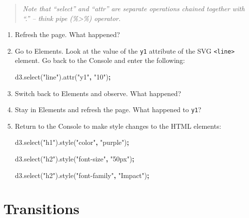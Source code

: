 \documentclass[openany]{book}
\newenvironment{Shaded}{\begin{snugshade}}{\end{snugshade}}
\newcommand{\AttributeTok}[1]{\textcolor[rgb]{0.77,0.63,0.00}{#1}}
\newcommand{\NormalTok}[1]{#1}
\newcommand{\OperatorTok}[1]{\textcolor[rgb]{0.81,0.36,0.00}{\textbf{#1}}}
\newcommand{\StringTok}[1]{\textcolor[rgb]{0.31,0.60,0.02}{#1}}
\newcommand{\VariableTok}[1]{\textcolor[rgb]{0.00,0.00,0.00}{#1}}
\begin{document}
\begin{quote}
 \emph{Note that ``select'' and ``attr'' are separate operations chained together with ``.'' -- think pipe (\%\textgreater{}\%) operator.}
\end{quote}

\begin{enumerate}
\def\labelenumi{\arabic{enumi}.}
\setcounter{enumi}{1}
\item
  Refresh the page. What happened?
\item
  Go to Elements. Look at the value of the \texttt{y1} attribute of the SVG \texttt{\textless{}line\textgreater{}} element. Go back to the Console and enter the following:

\begin{Shaded}
\begin{Highlighting}[]
\VariableTok{d3}\NormalTok{.}\AttributeTok{select}\NormalTok{(}\StringTok{"line"}\NormalTok{).}\AttributeTok{attr}\NormalTok{(}\StringTok{"y1"}\OperatorTok{,} \StringTok{"10"}\NormalTok{)}\OperatorTok{;}
\end{Highlighting}
\end{Shaded}
\item
  Switch back to Elements and observe. What happened?
\item
  Stay in Elements and refresh the page. What happened to \texttt{y1}?
\item
  Return to the Console to make style changes to the HTML elements:

\begin{Shaded}
\begin{Highlighting}[]
\VariableTok{d3}\NormalTok{.}\AttributeTok{select}\NormalTok{(}\StringTok{"h1"}\NormalTok{).}\AttributeTok{style}\NormalTok{(}\StringTok{"color"}\OperatorTok{,} \StringTok{"purple"}\NormalTok{)}\OperatorTok{;}

\VariableTok{d3}\NormalTok{.}\AttributeTok{select}\NormalTok{(}\StringTok{"h2"}\NormalTok{).}\AttributeTok{style}\NormalTok{(}\StringTok{"font-size"}\OperatorTok{,} \StringTok{"50px"}\NormalTok{)}\OperatorTok{;}

\VariableTok{d3}\NormalTok{.}\AttributeTok{select}\NormalTok{(}\StringTok{"h2"}\NormalTok{).}\AttributeTok{style}\NormalTok{(}\StringTok{"font-family"}\OperatorTok{,} \StringTok{"Impact"}\NormalTok{)}\OperatorTok{;}
\end{Highlighting}
\end{Shaded}
\end{enumerate}

\hypertarget{transitions}{%
\section{Transitions }\label{transitions}}
\end{document}
